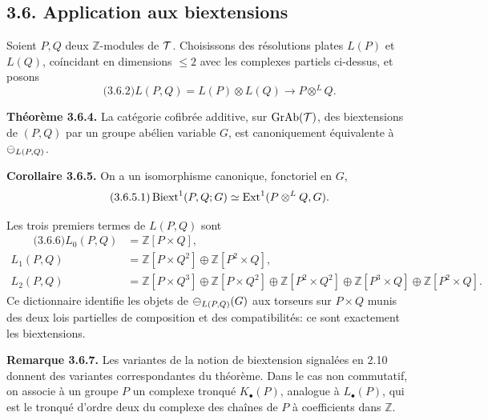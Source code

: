 \documentclass[11pt]{article}
\providecommand{\Ker}{\operatorname{Ker}}
\providecommand{\Z}{\mathbb Z}
\providecommand{\Ext}{\operatorname{Ext}}
\begin{document}
\subsection*{3.6. Application aux biextensions}
Soient \(P,Q\) deux \(\Z\)-modules de \(\cT\).  Choisissons des r\'esolutions plates \(L(P)\) et \(L(Q)\), co\'incidant en dimensions \(\leq2\) avec les complexes partiels ci-dessus, et posons
\begin{equation}\qquad\text{(3.6.2)}
  L(P,Q)=L(P)\otimes L(Q)\longrightarrow P\otimes^{L}Q.
\end{equation}

\textbf{Th\'eor\`eme 3.6.4.}  La cat\'egorie cofibr\'ee additive, sur \(\GrAb(\cT)\), des biextensions de \((P,Q)\) par un groupe ab\'elien variable \(G\), est canoniquement équivalente \`a \(\mathcal\Psi_{L(P,Q)}\).

\textbf{Corollaire 3.6.5.}  On a un isomorphisme canonique, fonctoriel en \(G\),
\begin{equation}\qquad\text{(3.6.5.1)}
  \Biext^1(P,Q;G)\simeq \Ext^1(P\otimes^{L}Q,G).
\end{equation}

Les trois premiers termes de \(L(P,Q)\) sont
\begin{align}\qquad\text{(3.6.6)}
L_0(P,Q)&=\Z[P\times Q],\\
L_1(P,Q)&=\Z[P\times Q^2]\oplus\Z[P^2\times Q],\\
L_2(P,Q)&=\Z[P\times Q^3]\oplus\Z[P\times Q^2]\oplus\Z[P^2\times Q^2]
\oplus\Z[P^3\times Q]\oplus\Z[P^2\times Q].
\end{align}
Ce dictionnaire identifie les objets de \(\mathcal\Psi_{L(P,Q)}(G)\) aux torseurs sur \(P\times Q\) munis des deux lois partielles de composition et des compatibilit\'es: ce sont exactement les biextensions.

\textbf{Remarque 3.6.7.}  Les variantes de la notion de biextension signal\'ees en 2.10 donnent des variantes correspondantes du th\'eor\`eme.  Dans le cas non commutatif, on associe \`a un groupe \(P\) un complexe tronqu\'e \(K_\bullet(P)\), analogue \`a \(L_\bullet(P)\), qui est le tronqu\'e d'ordre deux du complexe des cha\^ines de \(P\) \`a coefficients dans \(\Z\).



\providecommand{\Biext}{\operatorname{Biext}}
\providecommand{\Ext}{\operatorname{Ext}}
\providecommand{\Torop}{\operatorname{Tor}}
\providecommand{\GRAB}{\operatorname{GRAB}}
\providecommand{\RHom}{\operatorname{RHom}}
\providecommand{\Ker}{\operatorname{Ker}}
\providecommand{\coker}{\operatorname{coker}}
\providecommand{\cK}{\mathcal K}
\providecommand{\cL}{\mathcal L}
\providecommand{\cM}{\mathcal M}
\providecommand{\cT}{\mathcal T}
\providecommand{\dfn}{\mathrel{\mathrm{dfn}}}
\end{document}

